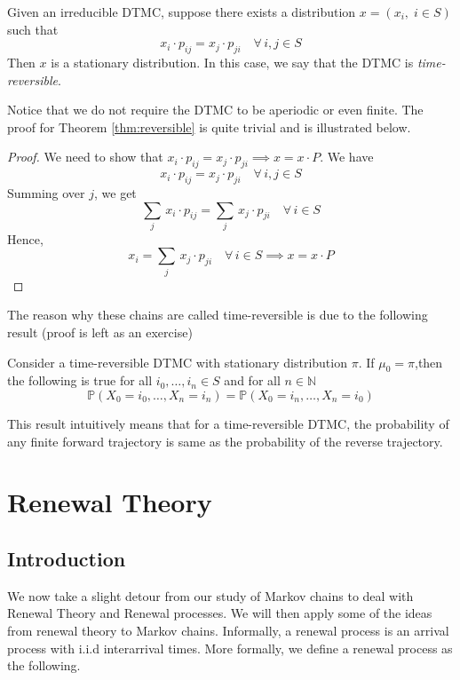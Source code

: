 \documentclass[12pt]{article}
\def\P{\mathbb{P}}
\theoremstyle{definition}
\begin{document}
\begin{thm} \label{thm:reversible}
    Given an irreducible DTMC, suppose there exists a distribution $x = \left( x_i, \; i \in S \right)$ such that
    \[
        x_i \cdot p_{ij} = x_j \cdot p_{ji} \quad \forall \, i,j \in S
    \]
    Then $x$ is a stationary distribution. In this case, we say that the DTMC is \emph{time-reversible}.
\end{thm}

Notice that we do not require the DTMC to be aperiodic or even finite. The proof for Theorem \ref{thm:reversible} is quite trivial and is illustrated below.

\begin{proof}
    We need to show that $x_i \cdot p_{ij} = x_j \cdot p_{ji} \implies x = x \cdot P$. We have
    \[
        x_i \cdot p_{ij} = x_j \cdot p_{ji} \quad \forall \, i,j \in S
    \]
    Summing over $j$, we get
    \[
        \sum_j \, x_i \cdot p_{ij} = \sum_j \, x_j \cdot p_{ji} \quad \forall \, i \in S
    \]
    Hence, 
    \[
        x_i = \sum_j \, x_j \cdot p_{ji} \quad \forall \, i \in S \implies x = x \cdot P
    \]  
\end{proof}

The reason why these chains are called time-reversible is due to the following result (proof is left as an exercise)

\begin{prop}
    Consider a time-reversible DTMC with stationary distribution $\pi$. If $\mu_0 = \pi$,then the following is true for all $i_0, \ldots , i_n \in S$ and for all $n \in \mathbb{N}$
    \[
        \P \left( X_0 = i_0, \ldots , X_n = i_n \right) = \P \left( X_0 = i_n, \ldots , X_n = i_0 \right)
    \]
\end{prop}

This result intuitively means that for a time-reversible DTMC, the probability of any finite forward trajectory is same as the probability of the reverse trajectory.

\newpage

\section{Renewal Theory}

\subsection{Introduction}

We now take a slight detour from our study of Markov chains to deal with Renewal Theory and Renewal processes. We will then apply some of the ideas from renewal theory to Markov chains. Informally, a renewal process is an arrival process with i.i.d interarrival times. More formally, we define a renewal process as the following. 
\end{document}
